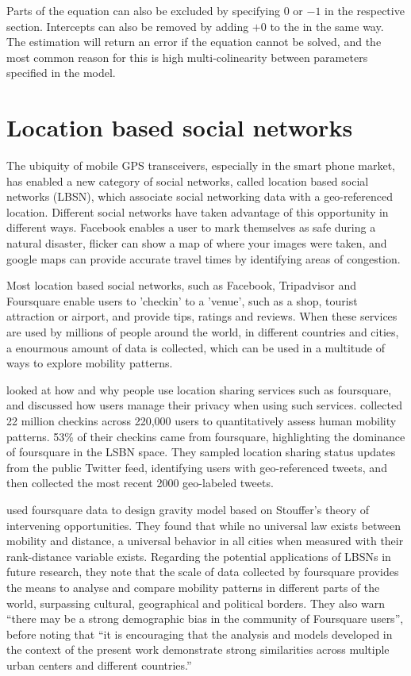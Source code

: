 Parts of the equation can also be excluded by specifying $0$ or $-1$ in the respective section. Intercepts can also be removed by adding $+ 0$ to the in the same way. The estimation will return an error if the equation cannot be solved, and the most common reason for this is high multi-colinearity between parameters specified in the model.

\section{Location based social networks}
The ubiquity of mobile GPS transceivers, especially in the smart phone market, has enabled a new category of social networks, called location based social networks (LBSN), which associate social networking data with a geo-referenced location. Different social networks have taken advantage of this opportunity in different ways. Facebook enables a user to mark themselves as safe during a natural disaster, flicker can show a map of where your images were taken, and google maps can provide accurate travel times by identifying areas of congestion. 

Most location based social networks, such as Facebook, Tripadvisor and Foursquare enable users to 'checkin' to a 'venue', such as a shop, tourist attraction or airport, and provide tips, ratings and reviews. When these services are used by millions of people around the world, in different countries and cities, a enourmous amount of data is collected, which can be used in a multitude of ways to explore mobility patterns. 

\textcite{lindqvist2011m} looked at how and why people use location sharing services such as foursquare, and discussed how users manage their privacy when using such services. \autocite{cheng2011exploring} collected 22 million checkins across 220,000 users to quantitatively assess human mobility patterns. 53\% of their checkins came from foursquare, highlighting the dominance of foursquare in the LSBN space. They sampled location sharing status updates from the public Twitter feed, identifying users with geo-referenced tweets, and then collected the most recent 2000 geo-labeled tweets.

\textcite{noulas2012tale} used foursquare data to design gravity model based on Stouffer's theory of intervening opportunities. They found that while no universal law exists between mobility and distance, a universal behavior in all cities when measured with their rank-distance variable exists. Regarding the potential applications of LBSNs in future research, they note that the scale of data collected by foursquare provides the means to analyse and compare mobility patterns in different parts of the world, surpassing cultural, geographical and political borders. They also warn \enquote{there may be a strong demographic bias in the community of Foursquare users}, before noting that \enquote{it is encouraging that the analysis and models developed in the context of the present work demonstrate strong similarities across multiple urban centers and different countries.}

